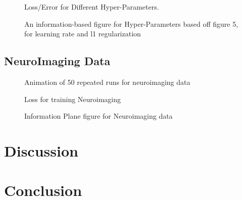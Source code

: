 \documentclass[conference, 5pt]{IEEEtran}
\begin{document}
\begin{figure}
\caption{Loss/Error for Different Hyper-Parameters.}
\end{figure}

\begin{figure}
\caption{An information-based figure for Hyper-Parameters based off figure 5, for learning rate and l1 regularization}
\end{figure}

\subsection{NeuroImaging Data}

\begin{figure}
\caption{Animation of 50 repeated runs for neuroimaging data}
\end{figure}

\begin{figure}
\caption{Loss for training Neuroimaging}
\end{figure}

\begin{figure}
\caption{Information Plane figure for Neuroimaging data}
\end{figure}

\section{Discussion}


\section{Conclusion}

\cite{shwartz2017opening}





\end{document}
